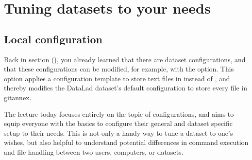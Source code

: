 \chapter{Tuning datasets to your needs}
\label{\detokenize{basics/basics-configuration:tuning-datasets-to-your-needs}}\label{\detokenize{basics/basics-configuration:chapter-config}}\label{\detokenize{basics/basics-configuration:id1}}\label{\detokenize{basics/basics-configuration::doc}}

\sphinxstepscope

\ignorespaces 

\section{Local configuration}
\label{\detokenize{basics/101-122-config:local-configuration}}\label{\detokenize{basics/101-122-config:config}}\label{\detokenize{basics/101-122-config:index-0}}\label{\detokenize{basics/101-122-config::doc}}
\sphinxAtStartPar
Back in section {\hyperref[\detokenize{basics/101-114-txt2git:text2git}]{}} (), you already learned that there
are dataset configurations, and that these configurations can
be modified, for example, with the  option.
This option applies a configuration template to store text
files in {\hyperref[\detokenize{glossary:term-Git}]{}} instead of {\hyperref[\detokenize{glossary:term-git-annex}]{}}, and thereby
modifies the DataLad dataset’s default configuration to store
every file in git\sphinxhyphen{}annex.

\sphinxAtStartPar
The lecture today focuses entirely on the topic of configurations,
and aims to equip everyone with the basics to configure
their general and dataset specific setup to their needs.
This is not only a handy way to tune a dataset to one’s
wishes, but also helpful to understand potential differences in
command execution and file handling between two users,
computers, or datasets.

